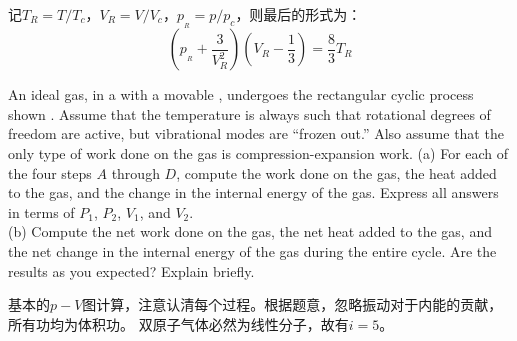\begin{solution}
        记$T_R = T/T_c$，$V_R = V/V_c$，$p_{_R} = p/p_c$，则最后的形式为：
        \begin{equation*}
            (p_{_R}+\frac{3}{V_R^{2}})(V_R-\frac{1}{3})=\frac{8}{3}T_R
        \end{equation*}
    \end{solution}
    \begin{solution}
    	An ideal  gas, in a  with a movable , undergoes the rectangular cyclic process shown
    	. Assume that the temperature is always such
    	that rotational degrees of freedom are active, but vibrational modes are “frozen out.” Also assume that the only
    	type of work done on the gas is  compression-expansion work.
    	(a) For each of the four steps $A$ through $D$, compute the work done on the gas, the heat added to
    	the gas, and the change in the internal energy of the gas.
    	Express all answers in terms of $P_1$, $P_2$, $V_1$, and $V_2$. \\
    	(b) Compute the net work done on the gas, the net
    	heat added to the gas, and the net change in the internal
    	energy of the gas during the entire cycle. Are the results
    	as you expected? Explain briefly.

		\tcbrule
		
        基本的$p-V$图计算，注意认清每个过程。根据题意，忽略振动对于内能的贡献，所有功均为体积功。
        双原子气体必然为线性分子，故有$i = 5$。


\end{solution}
